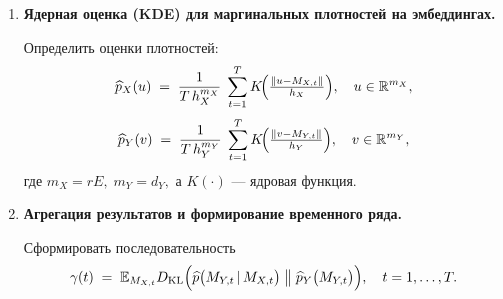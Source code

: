 \documentclass[a4paper, 12pt]{article}
\begin{document}
\begin{algorithm}[h!]
\begin{enumerate}
			\item \textbf{Ядерная оценка (KDE) для маргинальных плотностей на эмбеддингах.}
			
			Определить оценки плотностей:
			\[
			\widehat{p}_X(u)
			\;=\;
			\frac{1}{T\,h_X^{m_X}}
			\;\sum_{t=1}^T 
			K\!\Bigl(\tfrac{\|u - M_{X,t}\|}{h_X}\Bigr),
			\quad
			u \in \mathbb{R}^{m_X},
			\]
			\[
			\widehat{p}_Y(v)
			\;=\;
			\frac{1}{T\,h_Y^{m_Y}}
			\;\sum_{t=1}^T 
			K\!\Bigl(\tfrac{\|v - M_{Y,t}\|}{h_Y}\Bigr),
			\quad
			v \in \mathbb{R}^{m_Y},
			\]
			где $m_X = rE,\; m_Y = d_Y,$ а $K(\cdot)$ --- ядровая функция.
			
			\item \textbf{Агрегация результатов и формирование временного ряда.}
			
			Сформировать последовательность
			\[
			\gamma(t)
			\;=\;
			\mathbb{E}_{M_{X, t}} D_{\mathrm{KL}}\Bigl(
			\widehat{p}\bigl(M_{Y,t}\,\vert\,M_{X,t}\bigr)
			\;\big\|\;
			\widehat{p}_Y\bigl(M_{Y,t}\bigr)
			\Bigr),
			\quad t = 1,\dots,T.
			\]
		\end{enumerate}
		
	\end{algorithm}
	
	
	
	
\end{document}
